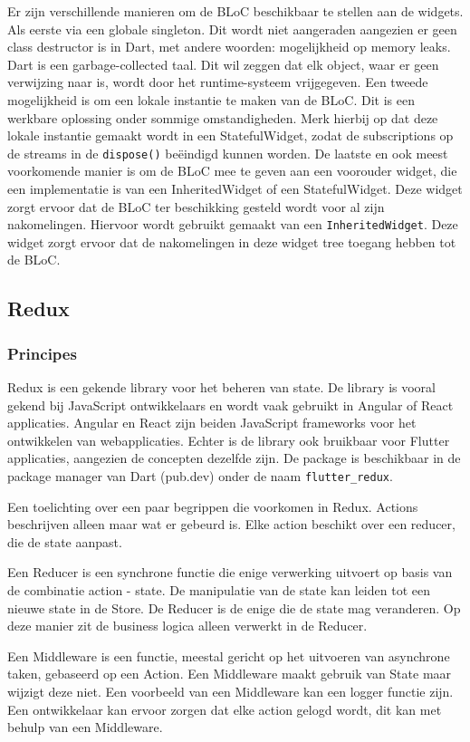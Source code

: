 Er zijn verschillende manieren om de BLoC beschikbaar te stellen aan de widgets. 
Als eerste via een globale singleton. Dit wordt niet aangeraden aangezien er geen class destructor is in Dart, met andere woorden: mogelijkheid op memory leaks. Dart is een garbage-collected taal. Dit wil zeggen dat elk object, waar er geen verwijzing naar is, wordt door het runtime-systeem vrijgegeven. 
Een tweede mogelijkheid is om een lokale instantie te maken van de BLoC. Dit is een werkbare oplossing onder sommige omstandigheden. Merk hierbij op dat deze lokale instantie gemaakt wordt in een StatefulWidget, zodat de subscriptions op de streams in de \verb|dispose()| beëindigd kunnen worden.
De laatste en ook meest voorkomende manier is om de BLoC mee te geven aan een voorouder widget, die een implementatie is van een InheritedWidget of een StatefulWidget. Deze widget zorgt ervoor dat de BLoC ter beschikking gesteld wordt voor al zijn nakomelingen. Hiervoor wordt gebruikt gemaakt van een \verb|InheritedWidget|. Deze widget zorgt ervoor dat de nakomelingen in deze widget tree toegang hebben tot de BLoC.

\subsection{Redux}
\label{ch:redux}
\subsubsection{Principes}
Redux is een gekende library voor het beheren van state. De library is vooral gekend bij JavaScript ontwikkelaars en wordt vaak gebruikt in Angular of React applicaties. Angular en React zijn beiden JavaScript frameworks voor het ontwikkelen van webapplicaties. Echter is de library ook bruikbaar voor Flutter applicaties, aangezien de concepten dezelfde zijn. De package is beschikbaar in de package manager van Dart (pub.dev) onder de naam \verb|flutter_redux|.

Een toelichting over een paar begrippen die voorkomen in Redux.
Actions beschrijven alleen maar wat er gebeurd is. Elke action beschikt over een reducer, die de state aanpast.

Een Reducer is een synchrone functie die enige verwerking uitvoert op basis van de combinatie action - state. De manipulatie van de state kan leiden tot een nieuwe state in de Store. De Reducer is de enige die de state mag veranderen. Op deze manier zit de business logica alleen verwerkt in de Reducer. 

Een Middleware is een functie, meestal gericht op het uitvoeren van asynchrone taken, gebaseerd op een Action. Een Middleware maakt gebruik van State maar wijzigt deze niet. Een voorbeeld van een Middleware kan een logger functie zijn. Een ontwikkelaar kan ervoor zorgen dat elke action gelogd wordt, dit kan met behulp van een Middleware.

